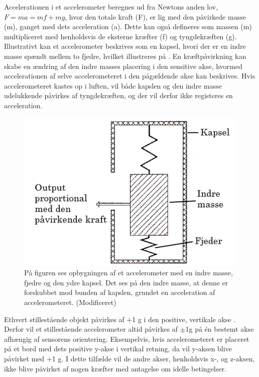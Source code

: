 Accelerationen i et accelerometer beregnes ud fra Newtons anden lov, $F=ma=mf+mg$, hvor den totale kraft (F), er lig med den påvirkede masse (m), ganget med dets acceleration (a). Dette kan også defineres som massen (m) multipliceret med henholdsvis de eksterne kræfter (f) og tyngdekræften (g). \citep{TittertonWeston2004,Academic2016d} \newline
Illustrativt kan et accelerometer beskrives som en kapsel, hvori der er en indre masse spændt mellem to fjedre, hvilket illustreres på . En kræftpåvirkning kan skabe en ændring af den indre masses placering i den sensitive akse, hvormed accelerationen af selve accelerometeret i den pågældende akse kan beskrives. Hvis accelerometeret kastes op i luften, vil både kapslen og den indre masse udelukkende påvirkes af tyngdekræften, og der vil derfor ikke registeres en acceleration.\citep{TittertonWeston2004,Academic2016d}
\begin{figure}[H]
	\centering
	\includegraphics[scale=0.4]{figures/bProblemloesning/accelerometer_basic.png}
	\caption{På figuren ses opbygningen af et accelerometer med en indre masse, fjedre og den ydre kapsel. Det ses på den indre masse, at denne er forskubbet mod bunden af kapslen, grundet en acceleration af accelerometeret. \citep{TittertonWeston2004} (Modificeret)}
	\label{acc_simpelt}
\end{figure}\vspace{-.2cm}
Ethvert stillestående objekt påvirkes af +1 g i den positive, vertikale akse \citep{Serway2010}. Derfor vil et stillestående accelerometer altid påvirkes af $\pm$1g på én bestemt akse afhængig af sensorens orientering. Eksempelvis, hvis accelerometeret er placeret på et bord med dets positive y-akse i vertikal retning, da vil y-aksen blive påvirket med $+$1 g. I dette tilfælde vil de andre akser, henholdsvis x-, og z-aksen, ikke blive påvirket af nogen kræfter med antagelse om idelle betingelser. 

